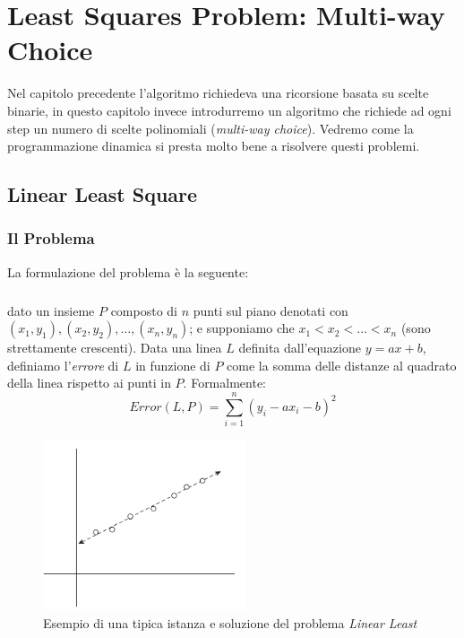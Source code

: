 \chapter{Least Squares Problem: Multi-way Choice }

Nel capitolo precedente l'algoritmo richiedeva una ricorsione basata su scelte
binarie, in questo capitolo invece introdurremo un algoritmo che richiede ad
ogni step un numero di scelte polinomiali (\textit{multi-way choice}). Vedremo
come la programmazione dinamica si presta molto bene a risolvere questi
problemi.

\section{Linear Least Square}

\subsection{Il Problema}

La formulazione del problema è la seguente:

\paragraph*{} dato un insieme $P$ composto di $n$ punti sul piano denotati con\\
$(x_1, y_1), (x_2, y_2), \ldots, (x_n, y_n)$; e supponiamo che $x_1 < x_2 <
    \ldots < x_n$ (sono strettamente crescenti). Data una linea $L$ definita
dall'equazione $y = ax + b$, definiamo l'\textit{errore} di $L$ in funzione
di $P$ come la somma delle distanze al quadrato della linea rispetto ai
punti in $P$. Formalmente:
\[
    Error(L, P) = \sum_{i=1}^{n} (y_i - ax_i - b)^2
\]

\begin{figure}[H]
    \centering
    \includegraphics[width=6cm, keepaspectratio]{capitoli/imgs/linear_least.png}
    \caption{Esempio di una tipica istanza e soluzione del problema
        \textit{Linear Least}}
\end{figure}

